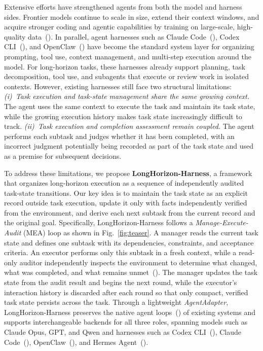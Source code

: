 \documentclass[]{fairmeta}
\renewcommand{\cite}[1]{(\citealp{#1})}
\begin{document}
Extensive efforts have strengthened agents from both the model and harness sides. Frontier models continue to scale in size, extend their context windows, and acquire stronger coding and agentic capabilities by training on large-scale, high-quality data~\cite{swerl,chu2025gpg,li2025adacurl,ma2026skillclaw, ji2025tree, yang2026coevolve}. In parallel, agent harnesses such as Claude Code~\cite{claudecode}, Codex CLI~\cite{codex}, and OpenClaw~\cite{openclaw} have become the standard system layer for organizing prompting, tool use, context management, and multi-step execution around the model. For long-horizon tasks, these harnesses already support planning, task decomposition, tool use, and subagents that execute or review work in isolated contexts. However, existing harnesses still face two structural limitations: \textit{(i)~Task execution and task-state management share the same growing context.} The agent uses the same context to execute the task and maintain its task state, while the growing execution history makes task state increasingly difficult to track. \textit{(ii)~Task execution and completion assessment remain coupled.} The agent performs each subtask and judges whether it has been completed, with an incorrect judgment potentially being recorded as part of the task state and used as a premise for subsequent decisions.




To address these limitations, we propose \textbf{LongHorizon-Harness}, a framework that organizes long-horizon execution as a sequence of independently audited task-state transitions. Our key idea is to maintain the task state as an explicit record outside task execution, update it only with facts independently verified from the environment, and derive each next subtask from the current record and the original goal. Specifically, LongHorizon-Harness follows a \emph{Manage-Execute-Audit} (MEA) loop as shown in Fig.~\ref{fig:teaser}. A manager reads the current task state and defines one subtask with its dependencies, constraints, and acceptance criteria. An executor performs only this subtask in a fresh context, while a read-only auditor independently inspects the environment to determine what changed, what was completed, and what remains unmet~\cite{agentasjudge,llmasjudge}. The manager updates the task state from the audit result and begins the next round, while the executor's interaction history is discarded after each round so that only compact, verified task state persists across the task. Through a lightweight \emph{AgentAdapter}, LongHorizon-Harness preserves the native agent loops~\cite{react} of existing systems and supports interchangeable backends for all three roles, spanning models such as Claude Opus, GPT, and Qwen and harnesses such as Codex CLI~\cite{codex}, Claude Code~\cite{claudecode}, OpenClaw~\cite{openclaw}, and Hermes Agent~\cite{hermes}.
\end{document}
